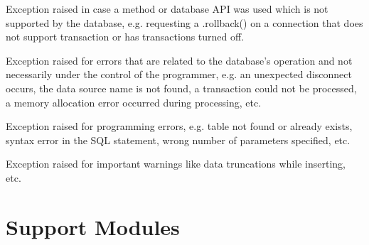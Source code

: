 \documentclass[letterpaper,10pt,english]{sphinxmanual}
\begin{document}
\begin{fulllineitems}
Exception raised in case a method or database API was used which is not supported by the database,
e.g. requesting a .rollback() on a connection that does not support transaction or has transactions turned off.

\end{fulllineitems}



\begin{fulllineitems}
Exception raised for errors that are related to the database’s operation and not necessarily under
the control of the programmer, e.g. an unexpected disconnect occurs, the data source name is not found,
a transaction could not be processed, a memory allocation error occurred during processing, etc.

\end{fulllineitems}



\begin{fulllineitems}
Exception raised for programming errors, e.g. table not found or already exists, syntax error in the SQL statement,
wrong number of parameters specified, etc.

\end{fulllineitems}



\begin{fulllineitems}
Exception raised for important warnings like data truncations while inserting, etc.

\end{fulllineitems}



\chapter{Support Modules}
\label{\detokenize{index:support-modules}}
\end{document}
